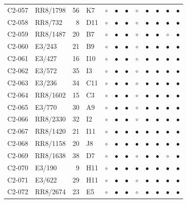 {\begin{longtable}{llrp{3.9cm}cccccccc}
    C2-057 & RR8/1798 & 56 & K7 & $\circ$ & $\bullet$ & $\bullet$ & $\circ$ & $\bullet$ & $\bullet$ & $\bullet$ & $\bullet$ \\
    C2-058 & RR8/732 & 8 & D11 & $\circ$ & $\bullet$ & $\bullet$ & $\circ$ & $\bullet$ & $\bullet$ & $\bullet$ & $\bullet$ \\
    C2-059 & RR8/1487 & 20 & B7 & $\circ$ & $\bullet$ & $\bullet$ & $\circ$ & $\bullet$ & $\bullet$ & $\circ$ & $\bullet$ \\
    C2-060 & E3/243 & 21 & B9 & $\circ$ & $\bullet$ & $\bullet$ & $\circ$ & $\bullet$ & $\bullet$ & $\bullet$ & $\bullet$ \\
    C2-061 & E3/427 & 16 & I10 & $\circ$ & $\bullet$ & $\bullet$ & $\circ$ & $\bullet$ & $\bullet$ & $\bullet$ & $\bullet$ \\
    C2-062 & E3/572 & 35 & I3 & $\circ$ & $\bullet$ & $\bullet$ & $\circ$ & $\bullet$ & $\bullet$ & $\bullet$ & $\bullet$ \\
    C2-063 & E3/236 & 34 & C11 & $\circ$ & $\bullet$ & $\bullet$ & $\circ$ & $\bullet$ & $\bullet$ & $\bullet$ & $\bullet$ \\
    C2-064 & RR8/1602 & 15 & C3 & $\circ$ & $\bullet$ & $\bullet$ & $\circ$ & $\bullet$ & $\bullet$ & $\bullet$ & $\bullet$ \\
    C2-065 & E3/770 & 30 & A9 & $\circ$ & $\bullet$ & $\bullet$ & $\circ$ & $\bullet$ & $\bullet$ & $\bullet$ & $\bullet$ \\
    C2-066 & RR8/2330 & 32 & I2 & $\circ$ & $\bullet$ & $\bullet$ & $\circ$ & $\bullet$ & $\bullet$ & $\bullet$ & $\bullet$ \\
    C2-067 & RR8/1420 & 21 & I11 & $\circ$ & $\bullet$ & $\bullet$ & $\bullet$ & $\bullet$ & $\bullet$ & $\bullet$ & $\bullet$ \\
    C2-068 & RR8/1158 & 20 & J8 & $\circ$ & $\bullet$ & $\bullet$ & $\bullet$ & $\bullet$ & $\bullet$ & $\bullet$ & $\bullet$ \\
    C2-069 & RR8/1638 & 38 & D7 & $\circ$ & $\bullet$ & $\bullet$ & $\circ$ & $\bullet$ & $\bullet$ & $\circ$ & $\bullet$ \\
    C2-070 & E3/190 & 9 & H11 & $\circ$ & $\bullet$ & $\bullet$ & $\bullet$ & $\bullet$ & $\bullet$ & $\bullet$ & $\bullet$ \\
    C2-071 & E3/622 & 29 & H11 & $\circ$ & $\bullet$ & $\bullet$ & $\circ$ & $\bullet$ & $\bullet$ & $\bullet$ & $\bullet$ \\
    C2-072 & RR8/2674 & 23 & E5 & $\circ$ & $\bullet$ & $\bullet$ & $\circ$ & $\bullet$ & $\bullet$ & $\bullet$ & $\bullet$ \\

\end{longtable}}
